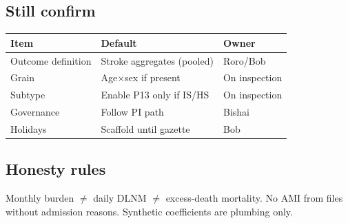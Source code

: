 \documentclass[10pt]{article}
\begin{document}
\vspace{0.35em}
\subsection*{Still confirm}
{\footnotesize
\begin{tabular}{@{}>{\raggedright\arraybackslash}p{3.2cm}>{\raggedright\arraybackslash}p{5.2cm}>{\raggedright\arraybackslash}p{2.8cm}@{}}
\toprule
\textbf{Item} & \textbf{Default} & \textbf{Owner} \\
\midrule
Outcome definition & Stroke aggregates (pooled) & Roro/Bob \\
Grain & Age$\times$sex if present & On inspection \\
Subtype & Enable P13 only if IS/HS & On inspection \\
Governance & Follow PI path & Bishai \\
Holidays & Scaffold until gazette & Bob \\
\bottomrule
\end{tabular}
}

\vspace{0.35em}
\subsection*{Honesty rules}
Monthly burden $\neq$ daily DLNM $\neq$ excess-death mortality.
No AMI from files without admission reasons.
Synthetic coefficients are plumbing only.

\vspace{0.2em}
\end{document}
